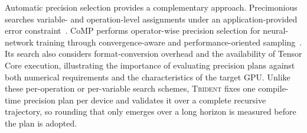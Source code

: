 Automatic precision selection provides a complementary approach. Precimonious searches variable- and operation-level assignments under an application-provided error constraint~\cite{rubio2013precimonious}. CoMP performs operator-wise precision selection for neural-network training through convergence-aware and performance-oriented sampling~\cite{dai2025comp}. Its search also considers format-conversion overhead and the availability of Tensor Core execution, illustrating the importance of evaluating precision plans against both numerical requirements and the characteristics of the target GPU. Unlike these per-operation or per-variable search schemes, \textsc{Trident} fixes one compile-time precision plan per device and validates it over a complete recursive trajectory, so rounding that only emerges over a long horizon is measured before the plan is adopted.
